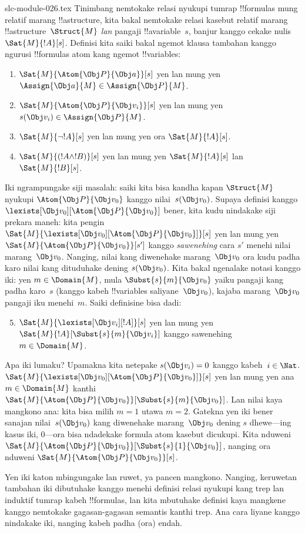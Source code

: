 \begin{filecontents*}[overwrite]{slc-module-026.tex}
Tinimbang nemtokake relasi nyukupi tumrap !!{formula}s mung relatif
marang !!a{structure}, kita bakal nemtokake relasi kasebut relatif
marang !!a{structure}~$\Struct{M}$ \emph{lan} pangaji
!!a{variable}~$s$, banjur kanggo cekake nulis $\Sat{M}{!A}[s]$.
Definisi kita saiki bakal ngemot klausa tambahan kanggo ngurusi
!!{formula}s atom kang ngemot !!{variable}s:
\begin{enumerate}
  \item $\Sat{M}{\Atom{\Obj P}{\Obj a}}[s]$ yen lan mung yen
  $\Assign{\Obj a}{M} \in \Assign{\Obj P}{M}$.
  \item $\Sat{M}{\Atom{\Obj P}{\Obj v_i}}[s]$ yen lan mung yen
  $s(\Obj v_i) \in \Assign{\Obj P}{M}$.
  \item $\Sat{M}{\lnot !A}[s]$ yen lan mung yen ora $\Sat{M}{!A}[s]$.
  \item $\Sat{M}{(!A \land !B)}[s]$ yen lan mung yen $\Sat{M}{!A}[s]$ lan $\Sat{M}{!B}[s]$.
\end{enumerate}
Iki ngrampungake siji masalah: saiki kita bisa kandha kapan $\Struct{M}$
nyukupi $\Atom{\Obj P}{\Obj v_0}$ kanggo nilai~$s(\Obj v_0)$. Supaya
definisi kanggo $\lexists[\Obj v_0][\Atom{\Obj P}{\Obj v_0}]$ bener,
kita kudu nindakake siji prekara maneh: kita pengin
$\Sat{M}{\lexists[\Obj v_0][\Atom{\Obj P}{\Obj v_0}]}[s]$ yen lan
mung yen $\Sat{M}{\Atom{\Obj P}{\Obj v_0}}[s']$ kanggo \emph{sawenehing}
cara $s'$ menehi nilai marang~$\Obj v_0$. Nanging, nilai kang diwenehake
marang~$\Obj v_0$ ora kudu padha karo nilai kang dituduhake dening
$s(\Obj v_0)$. Kita bakal ngenalake notasi kanggo iki: yen $m \in
\Domain{M}$, mula $\Subst{s}{m}{\Obj v_0}$ yaiku pangaji kang padha
karo~$s$ (kanggo kabeh !!{variable}s saliyane~$\Obj v_0$), kajaba
marang~$\Obj v_0$ pangaji iku menehi~$m$. Saiki definisine bisa dadi:
\begin{enumerate}\setcounter{enumi}{4}
  \item $\Sat{M}{\lexists[\Obj v_i][!A]}[s]$ yen lan mung yen
  $\Sat{M}{!A}[\Subst{s}{m}{\Obj v_i}]$ kanggo sawenehing~$m \in \Domain{M}$.
\end{enumerate}
Apa iki lumaku? Upamakna kita netepake $s(\Obj v_i) = 0$ kanggo
kabeh~$i \in \Nat$. $\Sat{M}{\lexists[\Obj v_0][\Atom{\Obj P}{\Obj
v_0}]}[s]$ yen lan mung yen ana $m \in \Domain{M}$ kanthi
$\Sat{M}{\Atom{\Obj P}{\Obj v_0}}[\Subst{s}{m}{\Obj v_0}]$. Lan
nilai kaya mangkono ana: kita bisa milih $m = 1$ utawa $m = 2$.
Gatekna yen iki bener sanajan nilai~$s(\Obj v_0)$ kang diwenehake
marang~$\Obj v_0$ dening $s$ dhewe---ing kasus iki, $0$---ora bisa
ndadekake formula atom kasebut dicukupi. Kita nduweni $\Sat{M}{\Atom{\Obj P}{\Obj
v_0}}[\Subst{s}{1}{\Obj v_0}]$, nanging ora nduweni
$\Sat{M}{\Atom{\Obj P}{\Obj v_0}}[s]$.

Yen iki katon mbingungake lan ruwet, ya pancen mangkono. Nanging,
keruwetan tambahan iki dibutuhake kanggo menehi definisi relasi
nyukupi kang trep lan induktif tumrap kabeh !!{formula}s, lan kita
mbutuhake definisi kaya mangkene kanggo nemtokake gagasan-gagasan
semantis kanthi trep. Ana cara liyane kanggo nindakake iki, nanging
kabeh padha (ora) endah.


\end{filecontents*}

